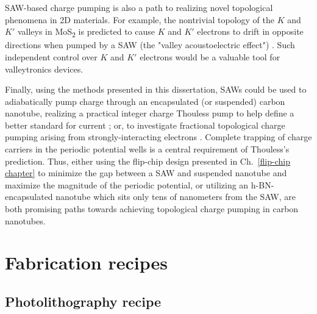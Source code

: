 \documentclass{beavtex_dub_edit}
\begin{document}
SAW-based charge pumping is also a path to realizing novel topological phenomena in 2D materials. For example, the nontrivial topology of the $K$ and $K'$ valleys in MoS\textsubscript{2} is predicted to cause $K$ and $K'$ electrons to drift in opposite directions when pumped by a SAW (the "valley acoustoelectric effect") \cite{kalameitsev_valley_2019}. Such independent control over $K$ and $K'$ electrons would be a valuable tool for valleytronics devices.

Finally, using the methods presented in this dissertation, SAWs could be used to adiabatically pump charge through an encapsulated (or suspended) carbon nanotube, realizing a practical integer charge Thouless pump to help define a better standard for current \cite{pekola_single-electron_2013,scherer_singleelectron_2019}; or, to investigate fractional topological charge pumping arising from strongly-interacting electrons \cite{novikov_devils_2005}. Complete trapping of charge carriers in the periodic potential wells is a central requirement of Thouless's prediction. Thus, either using the flip-chip design presented in Ch.\ \ref{flip-chip chapter} to minimize the gap between a SAW and suspended nanotube and maximize the magnitude of the periodic potential, or utilizing an h-BN-encapsulated nanotube which sits only tens of nanometers from the SAW, are both promising paths towards achieving topological charge pumping in carbon nanotubes.


\pagebreak




\appendix
\addappheadtotoc
\chapter{Fabrication recipes}


\section{Photolithography recipe} \label{photolithography recipe}
\end{document}
